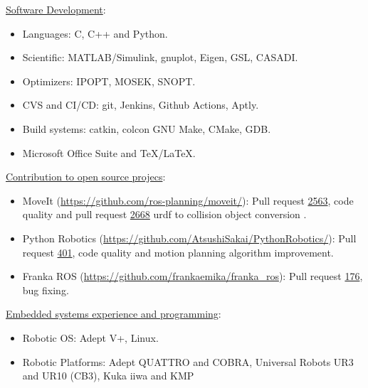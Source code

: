 \addskill%
{%
    \underline{Software Development}:%
    \begin{itemize}[nosep, rightmargin=0cm]%
        \item Languages: C, C++ and Python.%
        \item Scientific: MATLAB/Simulink, gnuplot, Eigen, GSL, CASADI.%
        \item Optimizers: IPOPT, MOSEK, SNOPT.%
        \item CVS and CI/CD: git, Jenkins, Github Actions, Aptly.%
        \item Build systems: catkin, colcon GNU Make, CMake, GDB.%
        \item Microsoft Office Suite and TeX/LaTeX.%
    \end{itemize}%
}%
\addskill%
{%
    \underline{Contribution to open source projecs}:%
    \begin{itemize}[nosep, rightmargin=0cm]%
        \item MoveIt (\url{https://github.com/ros-planning/moveit/}): Pull request \href{https://github.com/ros-planning/moveit/pull/2563}{2563}, code quality and pull request \href{https://github.com/ros-planning/moveit/pull/2663}{2668} urdf to collision object conversion .
        \item Python Robotics (\url{https://github.com/AtsushiSakai/PythonRobotics/}): Pull request  \href{https://github.com/AtsushiSakai/PythonRobotics/pull/401}{401}, code quality and motion planning algorithm improvement.
        \item Franka ROS (\url{https://github.com/frankaemika/franka_ros}): Pull request \href{https://github.com/frankaemika/franka_ros/pull/176}{176}, bug fixing.
    \end{itemize}%
}%
\addskill%
{%
    \underline{Embedded systems experience and programming}:%
    \begin{itemize}[nosep, rightmargin=0cm]%
        \item Robotic OS: Adept V+, Linux.%
        \item Robotic Platforms: Adept QUATTRO and COBRA, Universal Robots UR3 and UR10 (CB3), Kuka iiwa and KMP%
    \end{itemize}%
}%

